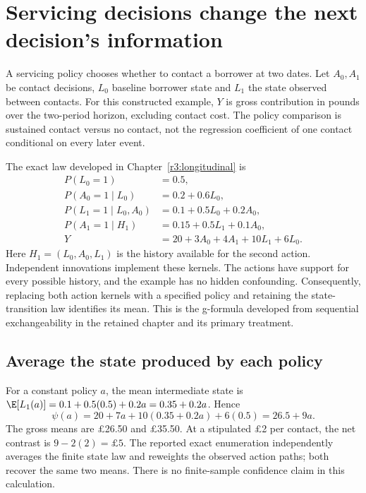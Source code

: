 \chapter{Servicing decisions change the next decision's information}
\label{rewrite:servicing}

A servicing policy chooses whether to contact a borrower at two dates. Let
$A_0,A_1$ be contact decisions, $L_0$ baseline borrower state and $L_1$ the
state observed between contacts. For this constructed example, $Y$ is
gross contribution in pounds over the two-period horizon, excluding contact
cost. The policy comparison is sustained contact versus no contact, not
the regression coefficient of one contact conditional on every later event.

The exact law developed in Chapter~\ref{r3:longitudinal} is
\begin{align*}
 P(L_0=1)&=0.5,\\
 P(A_0=1\mid L_0)&=0.2+0.6L_0,\\
 P(L_1=1\mid L_0,A_0)&=0.1+0.5L_0+0.2A_0,\\
 P(A_1=1\mid H_1)&=0.15+0.5L_1+0.1A_0,\\
 Y&=20+3A_0+4A_1+10L_1+6L_0.
\end{align*}
Here $H_1=(L_0,A_0,L_1)$ is the history available for the second action.
Independent innovations implement these kernels. The actions have support
for every possible history, and the example has no hidden confounding.
Consequently, replacing both action kernels with a specified policy and
retaining the state-transition law identifies its mean. This is the
g-formula developed from sequential exchangeability in the retained chapter
and its primary treatment. \citep[Chapter 21]{hernan2020}

\section{Average the state produced by each policy}
For a constant policy $a$, the mean intermediate state is
$\E[L_1(a)]=0.1+0.5(0.5)+0.2a=0.35+0.2a$. Hence
\[
 \psi(a)=20+7a+10(0.35+0.2a)+6(0.5)=26.5+9a.
\]
The gross means are \pounds26.50 and \pounds35.50. At a stipulated
\pounds2 per contact, the net contrast is $9-2(2)=\pounds5$.
The reported exact enumeration independently averages the finite state law
and reweights the observed action paths; both recover the same two means.
There is no finite-sample confidence claim in this calculation.

